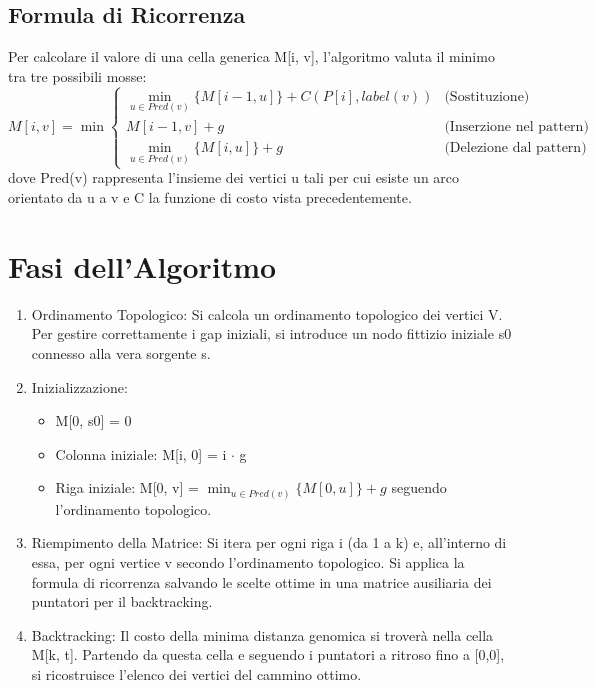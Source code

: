 \documentclass[11pt, a4paper]{article}
\begin{document}
\subsection{Formula di Ricorrenza}
Per calcolare il valore di una cella generica M[i, v], l'algoritmo valuta il minimo tra tre possibili mosse:
\begin{equation}
M[i, v] = \min 
\begin{cases} 
\min_{u \in Pred(v)} \{ M[i-1, u] \} + C(P[i], label(v)) & \text{(Sostituzione)} \\
M[i-1, v] + g & \text{(Inserzione nel pattern)} \\
\min_{u \in Pred(v)} \{ M[i, u] \} + g & \text{(Delezione dal pattern)}
\end{cases}
\end{equation}
dove Pred(v) rappresenta l'insieme dei vertici u tali per cui esiste un arco orientato da u a v e C la funzione di costo vista precedentemente.

\section{Fasi dell'Algoritmo}
\begin{enumerate}
    \item Ordinamento Topologico: Si calcola un ordinamento topologico dei vertici V. Per gestire correttamente i gap iniziali, si introduce un nodo fittizio iniziale s0 connesso alla vera sorgente s.
    \item Inizializzazione:
    \begin{itemize}
        \item M[0, s0] = 0
        \item Colonna iniziale: M[i, 0] = i $\cdot$ g
        \item Riga iniziale: M[0, v] = $\min_{u \in Pred(v)} \{ M[0, u] \} + g$ seguendo l'ordinamento topologico.
    \end{itemize}
    \item Riempimento della Matrice: Si itera per ogni riga i (da 1 a k) e, all'interno di essa, per ogni vertice v secondo l'ordinamento topologico. Si applica la formula di ricorrenza salvando le scelte ottime in una matrice ausiliaria dei puntatori per il backtracking.
    \item Backtracking: Il costo della minima distanza genomica si troverà nella cella M[k, t]. Partendo da questa cella e seguendo i puntatori a ritroso fino a [0,0], si ricostruisce l'elenco dei vertici del cammino ottimo.
\end{enumerate}
\end{document}
